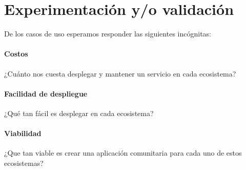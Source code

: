 \section{Experimentación y/o validación}


De los casos de uso esperamos responder las siguientes incógnitas: %

\paragraph{Costos} ¿Cuánto nos cuesta desplegar y mantener un servicio en cada ecosistema?

\paragraph{Facilidad de despliegue} ¿Qué tan fácil es desplegar en cada ecosistema?

\paragraph{Viabilidad} ¿Que tan viable es crear una aplicación comunitaria para cada uno de estos ecosistemas?